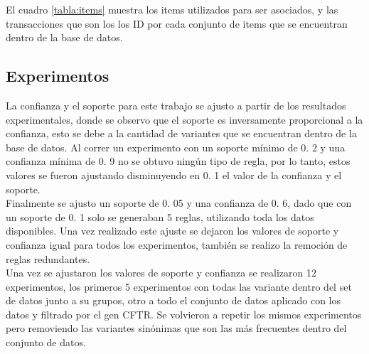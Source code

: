\begin{table}[H]
	\centering
\caption{Cuadro de items y transacciones}
\label{tabla:items}
\end{table}
 
El cuadro \ref{tabla:items} muestra los items utilizados para ser asociados, y las transacciones que son los los ID por cada conjunto de items que se encuentran dentro de la base de datos. 

\subsection{Experimentos}

La confianza y el soporte para este trabajo se ajusto a partir de los resultados experimentales, donde se observo que el soporte es inversamente proporcional a la confianza, esto se debe a la cantidad de variantes que se encuentran dentro de la base de datos. Al correr un experimento con un soporte mínimo de 0. 2 y una confianza mínima de 0. 9 no se obtuvo ningún tipo de regla, por lo tanto, estos valores se fueron ajustando disminuyendo en 0. 1 el valor de la confianza y el soporte. \\

Finalmente se ajusto un soporte de 0. 05 y una confianza de 0. 6, dado que con un soporte de 0. 1 solo se generaban 5 reglas, utilizando toda los datos disponibles. Una vez realizado este ajuste se dejaron los valores de soporte y confianza igual para todos los experimentos, también se realizo la remoción de reglas redundantes. \\

Una vez se ajustaron los valores de soporte y confianza se realizaron 12 experimentos, los primeros 5 experimentos con todas las variante dentro del set de datos junto a su grupos, otro a todo el conjunto de datos aplicado con los datos y filtrado por el gen CFTR. Se volvieron a repetir los mismos experimentos pero removiendo las variantes sinónimas que son las más frecuentes dentro del conjunto de datos. 


